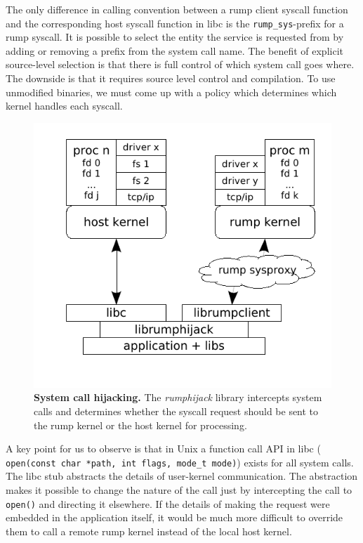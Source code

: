 The only difference in calling convention between a rump client
syscall function and the corresponding host syscall function in
libc is the \verb+rump_sys+-prefix for a rump syscall.
It is possible to select the entity the service is requested from
by adding or removing a prefix from the system call name.
The benefit of explicit source-level selection is that there is
full control of which system call goes where.  The downside is that
it requires source level control and compilation.  To
use unmodified binaries, we must come up with a policy which
determines which kernel handles each syscall.

\begin{figure}[t]
\includegraphics{hijack.pdf}
\caption[System call hijacking]{
\textbf{System call hijacking.}
The \textit{rumphijack} library intercepts system calls and determines
whether the syscall request should be sent to the rump kernel or the
host kernel for processing.
}
\label{fig:hijack}
\end{figure}

A key point for us to observe is that in Unix a function call API in libc (\eg
\verb+open(const char *path, int flags, mode_t mode)+) exists for
all system calls.  The libc stub abstracts the details of user-kernel
communication.  The abstraction makes it possible to change the nature of
the call just by intercepting the call to \texttt{open()} and directing
it elsewhere.  If the details of making the request were embedded in the
application itself, it would be much more difficult to override them to
call a remote rump kernel instead of the local host kernel.

